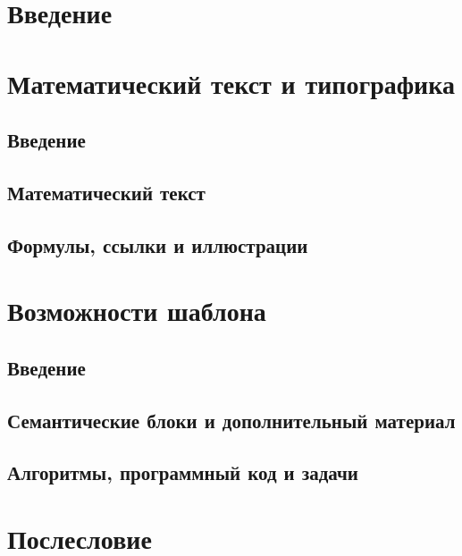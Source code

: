 \documentclass[11pt,twoside,openany]{report}
\begin{document}


\setcounter{page}{3}
\tableofcontents
\clearpage
\chapter*{Введение}
    
\chapter{Математический текст и типографика}                    %
    \section*{Введение}
        
    \section{Математический текст}
        
    \section{Формулы, ссылки и иллюстрации}
        
\chapter{Возможности шаблона}                                   %
    \section*{Введение}
        
    \section{Семантические блоки и дополнительный материал}
        
    \section{Алгоритмы, программный код и задачи}
        
\chapter*{Послесловие}
    
\appendix
\addto\captionsrussian{\renewcommand{\chaptername}{Приложение}}

\todototoc
{}
\end{document}
